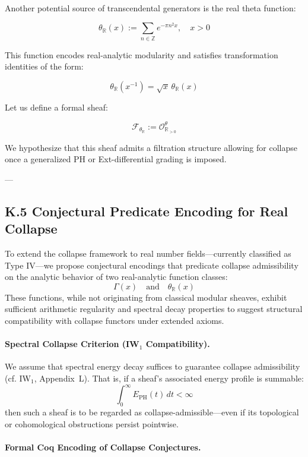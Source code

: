 \documentclass[11pt]{article}
\begin{document}
Another potential source of transcendental generators is the real theta function:

\[
\theta_{\mathbb{R}}(x) := \sum_{n \in \mathbb{Z}} e^{-\pi n^2 x}, \quad x > 0
\]

This function encodes real-analytic modularity and satisfies transformation identities of the form:

\[
\theta_{\mathbb{R}}(x^{-1}) = \sqrt{x}\, \theta_{\mathbb{R}}(x)
\]

Let us define a formal sheaf:

\[
\mathcal{F}_{\theta_{\mathbb{R}}} := \mathcal{O}^{\theta}_{\mathbb{R}_{>0}}
\]

We hypothesize that this sheaf admits a filtration structure allowing for collapse once a generalized PH or Ext-differential grading is imposed.

---

\subsection*{K.5 Conjectural Predicate Encoding for Real Collapse}
\label{sec:real-collapse-predicates}

To extend the collapse framework to real number fields—currently classified as Type IV—we propose conjectural encodings that predicate collapse admissibility on the analytic behavior of two real-analytic function classes:
\[
\Gamma(x) \quad \text{and} \quad \theta_{\mathbb{R}}(x)
\]
These functions, while not originating from classical modular sheaves, exhibit sufficient arithmetic regularity and spectral decay properties to suggest structural compatibility with collapse functors under extended axioms.

\medskip

\paragraph{Spectral Collapse Criterion (IW$_1$ Compatibility).}

We assume that spectral energy decay suffices to guarantee collapse admissibility (cf. IW$_1$, Appendix~L). That is, if a sheaf’s associated energy profile is summable:
\[
\int_0^\infty E_{\mathrm{PH}}(t)\, dt < \infty
\]
then such a sheaf is to be regarded as collapse-admissible—even if its topological or cohomological obstructions persist pointwise.

\medskip

\paragraph{Formal Coq Encoding of Collapse Conjectures.}
\end{document}
